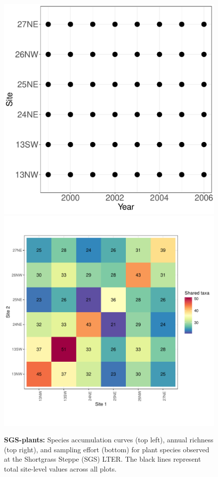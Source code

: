 \documentclass[11pt, oneside]{article}
\begin{document}
\begin{figure}[h!]
\includegraphics[scale = 0.4]{sgs-plants-catano_spatiotemporal_sampling_effort.pdf}
\includegraphics[scale = 0.4]{sgs-plants-catano_spp_shared.pdf}
\caption{{\bf SGS-plants:} Species accumulation curves (top left),  annual richness (top right), and sampling effort (bottom)  for plant species observed at the Shortgrass Steppe (SGS) LTER. The black lines represent total site-level values across all plots.}
\label{sgs-plants}
\end{figure}
\end{document}
